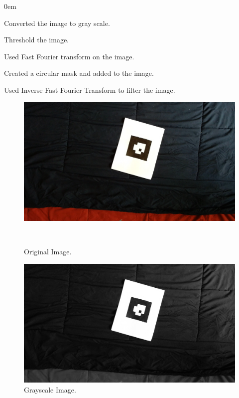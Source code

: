 \documentclass[11pt]{article}
\begin{document}
\begin{description}

\addtolength{\itemindent}{0.80cm}
\itemsep0em 
\item[1.] Converted the image to gray scale.
\item[2.] Threshold the image.
\item[3.] Used Fast Fourier transform on the image.
\item[4.] Created a circular mask and added to the image.
\item[5.] Used Inverse Fast Fourier Transform to filter the image.

\begin{figure}[!htbp]
  \centering
	\includegraphics[width=1\textwidth]{frame15}
	\caption{Original Image.}
	\
\end{figure}

\begin{figure}[!htbp]
  \centering
	\includegraphics[width=1\textwidth]{Grayscale}
	\caption{Grayscale Image.} 
\end{figure}


\end{description}
\end{document}
